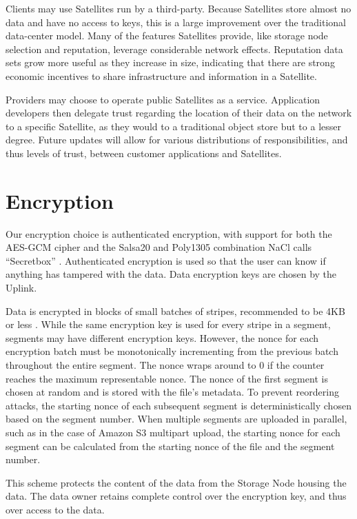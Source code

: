 \documentclass[8pt,fleqn,openany]{book}
\begin{document}
Clients may use Satellites run by a third-party. Because Satellites store almost no
data and have no access to keys, this is a large improvement over the
traditional data-center model. Many of the features Satellites provide, like
storage node selection and reputation, leverage considerable network effects.
Reputation data sets grow more useful as they increase in size,
indicating that there are strong economic incentives to share infrastructure
and information in a Satellite.

Providers may choose to operate public Satellites as a service.
Application developers then delegate trust regarding the location of their
data on the network to a specific Satellite, as they
would to a traditional object store but to a lesser degree. Future updates
will allow for various distributions of responsibilities, and thus levels of
trust, between customer applications and Satellites.

\section{Encryption}\label{sec:concrete-encryption}

Our encryption choice is authenticated encryption, with support for both the
AES-GCM cipher and the Salsa20 and Poly1305 combination NaCl calls ``Secretbox''
\cite{nacl-crypto}. Authenticated encryption is used so that the user can know
if anything has tampered with the data. Data encryption keys are chosen by the
Uplink.

Data is encrypted in blocks of small batches of stripes, recommended to be
4KB or less \cite{nacl-packetlen}. While the same encryption key is used for
every stripe in a segment, segments may have
different encryption keys. However, the nonce for each encryption
batch must be monotonically incrementing from the previous batch throughout the
entire segment. The nonce wraps around to 0 if the counter reaches the
maximum representable nonce.
The nonce of the first segment is chosen at random and is stored with the
file's metadata. To prevent reordering attacks, the starting nonce of each
subsequent segment is deterministically chosen based on the segment number.
When multiple segments are uploaded in parallel, such as in the case of
Amazon S3 multipart upload, the starting nonce for each segment can be
calculated from the starting nonce of the file and the segment number.

This scheme protects the
content of the data from the Storage Node housing the data. The data owner
retains complete control over the encryption key, and thus over access to the
data.
\end{document}
